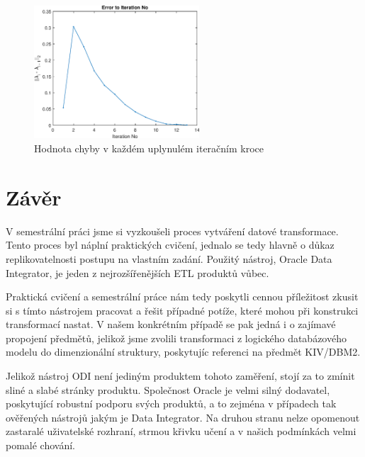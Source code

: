 \begin{figure}[htb]
    \centering
    \includegraphics[width=0.55\textwidth]{graphs/fig4.eps}
    \caption{Hodnota chyby v každém uplynulém iteračním kroce}
    \label{fig:result4}
\end{figure}
\FloatBarrier

\section{Závěr}

V semestrální práci jsme si vyzkoušeli proces vytváření datové transformace.
Tento proces byl náplní praktických cvičení, jednalo se tedy hlavně o důkaz replikovatelnosti postupu na vlastním zadání.
Použitý nástroj, Oracle Data Integrator, je jeden z nejrozšířenějších ETL produktů vůbec.

Praktická cvičení a semestrální práce nám tedy poskytli cennou příležitost zkusit si s tímto nástrojem pracovat a řešit případné potíže, které mohou při konstrukci transformací nastat.
V našem konkrétním případě se pak jedná i o zajímavé propojení předmětů, jelikož jsme zvolili transformaci z logického databázového modelu do dimenzionální struktury, poskytujíc referenci na předmět KIV/DBM2.

Jelikož nástroj ODI není jediným produktem tohoto zaměření, stojí za to zmínit sliné a slabé stránky produktu.
Společnost Oracle je velmi silný dodavatel, poskytující robustní podporu svých produktů, a to zejména v případech tak ověřených nástrojů jakým je Data Integrator.
Na druhou stranu nelze opomenout zastaralé uživatelské rozhraní, strmou křivku učení a v našich podmínkách velmi pomalé chování.
